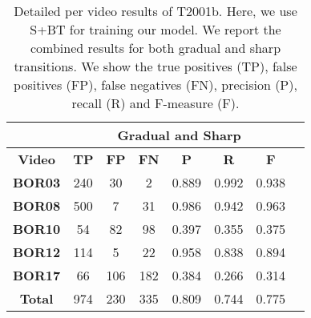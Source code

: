 \documentclass[journal]{IEEEtran}
\begin{document}
\begin{table}[h]
\centering

\begin{tabular}{|c|c|c|c|c|c|c|c|}
\hline
& \multicolumn{6}{c|}{\textbf{Gradual and Sharp}}  \\ \hline
\textbf{Video}  & \textbf{TP} & \textbf{FP} & \textbf{FN} & \textbf{P} & \textbf{R} & \textbf{F} \\ \hline
\textbf{BOR03}   & 240         & 30          & 2           & 0.889      & 0.992      & 0.938      \\ \hline
\textbf{BOR08}   & 500         & 7           & 31          & 0.986      & 0.942      & 0.963      \\ \hline
\textbf{BOR10}   & 54          & 82          & 98          & 0.397      & 0.355      & 0.375      \\ \hline
\textbf{BOR12}   & 114         & 5           & 22          & 0.958      & 0.838      & 0.894      \\ \hline
\textbf{BOR17}   & 66          & 106         & 182         & 0.384      & 0.266      & 0.314      \\ \hline
\textbf{Total}   & 974         & 230         & 335         & 0.809      & 0.744      & 0.775      \\ \hline
\end{tabular}
\caption{Detailed per video results of T2001b. Here, we use S+BT for training our model. We report the combined results for both gradual and sharp transitions. We show the true positives (TP), false positives (FP), false negatives (FN), precision (P), recall (R) and F-measure (F).}
\label{2001b_01}
\end{table}
\end{document}
